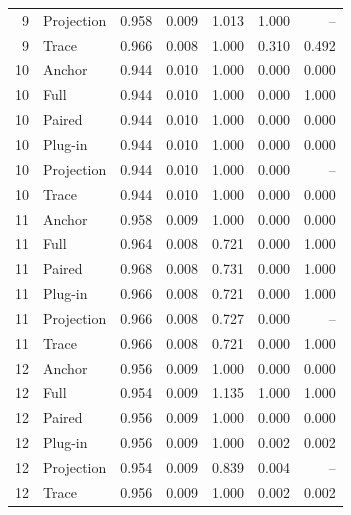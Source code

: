 \begin{longtable}{rlrrrrr}
9 & Projection & 0.958 & 0.009 & 1.013 & 1.000 & --\\
9 & Trace & 0.966 & 0.008 & 1.000 & 0.310 & 0.492\\
10 & Anchor & 0.944 & 0.010 & 1.000 & 0.000 & 0.000\\
10 & Full & 0.944 & 0.010 & 1.000 & 0.000 & 1.000\\
10 & Paired & 0.944 & 0.010 & 1.000 & 0.000 & 0.000\\
10 & Plug-in & 0.944 & 0.010 & 1.000 & 0.000 & 0.000\\
10 & Projection & 0.944 & 0.010 & 1.000 & 0.000 & --\\
10 & Trace & 0.944 & 0.010 & 1.000 & 0.000 & 0.000\\
11 & Anchor & 0.958 & 0.009 & 1.000 & 0.000 & 0.000\\
11 & Full & 0.964 & 0.008 & 0.721 & 0.000 & 1.000\\
11 & Paired & 0.968 & 0.008 & 0.731 & 0.000 & 1.000\\
11 & Plug-in & 0.966 & 0.008 & 0.721 & 0.000 & 1.000\\
11 & Projection & 0.966 & 0.008 & 0.727 & 0.000 & --\\
11 & Trace & 0.966 & 0.008 & 0.721 & 0.000 & 1.000\\
12 & Anchor & 0.956 & 0.009 & 1.000 & 0.000 & 0.000\\
12 & Full & 0.954 & 0.009 & 1.135 & 1.000 & 1.000\\
12 & Paired & 0.956 & 0.009 & 1.000 & 0.000 & 0.000\\
12 & Plug-in & 0.956 & 0.009 & 1.000 & 0.002 & 0.002\\
12 & Projection & 0.954 & 0.009 & 0.839 & 0.004 & --\\
12 & Trace & 0.956 & 0.009 & 1.000 & 0.002 & 0.002\\
\end{longtable}\endgroup